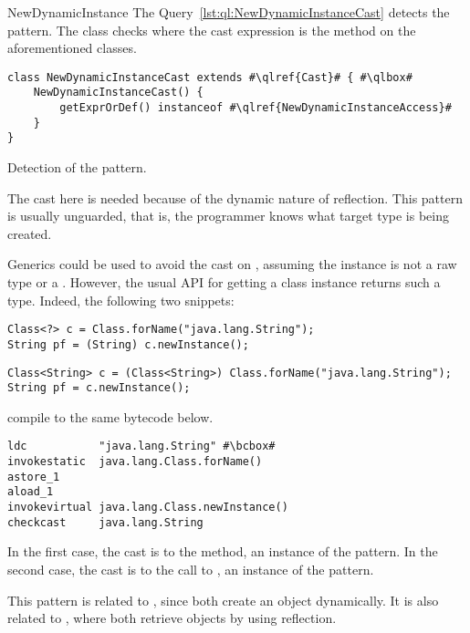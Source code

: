 \begin{pattern}{NewDynamicInstance}
\detection{}
The Query~\ref{lst:ql:NewDynamicInstanceCast} detects the \thisp{} pattern.
The \ql{}  class checks where the cast expression is the  method on the aforementioned classes.

\begin{listing}
\begin{verbatim}
class NewDynamicInstanceCast extends #\qlref{Cast}# { #\qlbox#
	NewDynamicInstanceCast() {
		getExprOrDef() instanceof #\qlref{NewDynamicInstanceAccess}#
	}
}
\end{verbatim}
\caption{Detection of the \thisp{} pattern.}
\label{lst:ql:NewDynamicInstanceCast}
\end{listing}


\issues{}
The cast here is needed because of the dynamic nature of reflection.
This pattern is usually unguarded, that is,
the programmer knows what target type is being created.

Generics could be used to avoid the cast on , assuming the  instance is 
not a raw type or a .
However, the usual API for getting a class instance 
returns such a type.
Indeed, the following two snippets:

\begin{verbatim}
Class<?> c = Class.forName("java.lang.String");
String pf = (String) c.newInstance();
\end{verbatim}

\begin{verbatim}
Class<String> c = (Class<String>) Class.forName("java.lang.String");
String pf = c.newInstance();
\end{verbatim}

compile to the same bytecode below.

\begin{listing}
\begin{verbatim}
ldc           "java.lang.String" #\bcbox#
invokestatic  java.lang.Class.forName()
astore_1
aload_1
invokevirtual java.lang.Class.newInstance()
checkcast     java.lang.String
\end{verbatim}
\end{listing}

In the first case, the cast is to the  method,
an instance of the \thisp{} pattern.
In the second case, the cast is to the call to ,
an instance of the  pattern.

This pattern is related to ,
since both create an object dynamically.
It is also related to ,
where both retrieve objects by using reflection.

\end{pattern}